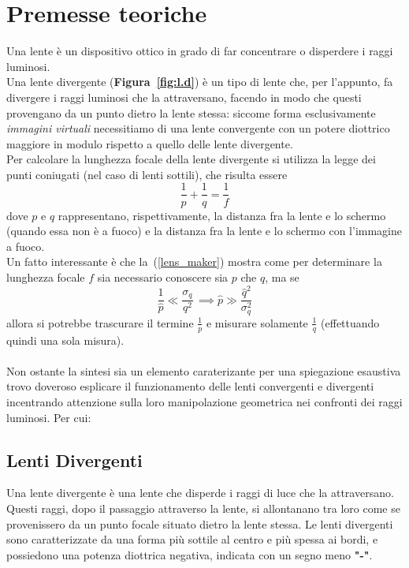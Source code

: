 \documentclass{article}
\begin{document}
\section{Premesse teoriche}
	Una lente è un dispositivo ottico in grado di far concentrare o disperdere i raggi luminosi. \\
	\noindent Una lente divergente (\textbf{Figura~\ref{fig:l.d}}) è un tipo di lente che, per l'appunto, fa divergere i raggi luminosi che la attraversano, facendo in modo che questi provengano da un punto dietro la lente stessa: siccome forma esclusivamente \emph{immagini virtuali} necessitiamo di una lente convergente con un potere diottrico maggiore in modulo rispetto a quello delle lente divergente. \\
	Per calcolare la lunghezza focale della lente divergente si utilizza la legge dei punti coniugati (nel caso di lenti sottili), che risulta essere
	\begin{equation}
		\frac{1}{p} + \frac{1}{q} = \frac{1}{f}
		\label{lens_maker}	
	\end{equation}
	dove $p$ e $q$ rappresentano, rispettivamente, la distanza fra la lente e lo schermo (quando essa non è a fuoco) e la distanza fra la lente e lo schermo con l'immagine a fuoco. \\
	Un fatto interessante è che la~(\ref{lens_maker}) mostra come per determinare la lunghezza focale $f$ sia necessario conoscere sia $p$ che $q$, ma se
	\begin{equation}
		\frac{1}{\hat{p}} \ll \frac{\sigma_q}{q^2} \, \implies \hat{p} \gg \frac{\hat{q}^2}{\sigma_q^2}
	\end{equation}
	allora si potrebbe trascurare il termine $\frac{1}{p}$ e misurare solamente $\frac{1}{q}$ (effettuando quindi una sola misura).
\\\\
Non ostante la sintesi sia un elemento caraterizante per una spiegazione esaustiva trovo doveroso esplicare il funzionamento delle lenti convergenti e divergenti incentrando attenzione sulla loro manipolazione geometrica nei confronti dei raggi luminosi. Per cui:  
\subsection*{Lenti Divergenti}
Una lente divergente è una lente che disperde i raggi di luce che la attraversano. Questi raggi, dopo il passaggio attraverso la lente, si allontanano tra loro come se provenissero da un punto focale situato dietro la lente stessa. Le lenti divergenti sono caratterizzate da una forma più sottile al centro e più spessa ai bordi, e possiedono una potenza diottrica negativa, indicata con un segno meno \textbf{"-"}.
\end{document}
